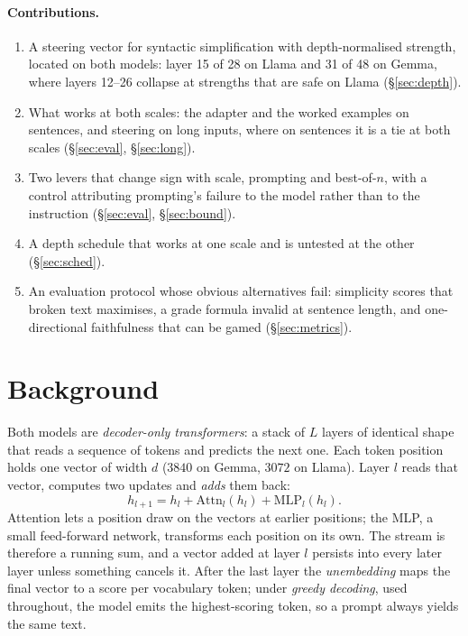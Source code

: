 \documentclass[aps,prb,reprint,nofootinbib,a4paper]{revtex4-2}
\begin{document}
\paragraph{Contributions.}
\begin{enumerate}
\item A steering vector for syntactic simplification with depth-normalised
strength, located on both models: layer 15 of 28 on Llama and 31 of 48 on
Gemma, where layers 12--26 collapse at strengths that are safe on Llama
(\S\ref{sec:depth}).
\item What works at both scales: the adapter and the worked examples on
sentences, and steering on long inputs, where on sentences it is a tie at both
scales (\S\ref{sec:eval}, \S\ref{sec:long}).
\item Two levers that change sign with scale, prompting and best-of-$n$, with a
control attributing prompting's failure to the model rather than to the
instruction (\S\ref{sec:eval}, \S\ref{sec:bound}).
\item A depth schedule that works at one scale and is untested at the other
(\S\ref{sec:sched}).
\item An evaluation protocol whose obvious alternatives fail: simplicity
scores that broken text maximises, a grade formula invalid at sentence length,
and one-directional faithfulness that can be gamed (\S\ref{sec:metrics}).
\end{enumerate}

\section{Background}
\label{sec:background}

Both models are \emph{decoder-only transformers}: a stack of $L$ layers of
identical shape that reads a sequence of tokens and predicts the next one. Each
token position holds one vector of width $d$ ($3840$ on Gemma, $3072$ on
Llama). Layer $l$ reads that vector, computes two updates and \emph{adds} them
back:
\begin{equation}
h_{l+1} = h_l + \mathrm{Attn}_l(h_l) + \mathrm{MLP}_l(h_l).
\end{equation}
Attention lets a position draw on the vectors at earlier positions; the MLP, a
small feed-forward network, transforms each position on its own. The stream is
therefore a running sum, and a vector added at layer $l$ persists into every
later layer unless something cancels it. After the last layer the
\emph{unembedding} maps the final vector to a score per vocabulary token; under
\emph{greedy decoding}, used throughout, the model emits the highest-scoring
token, so a prompt always yields the same text.
\end{document}
